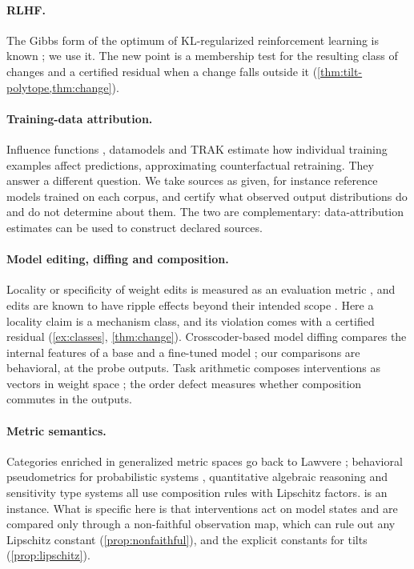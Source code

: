 \documentclass[11pt]{article}
\theoremstyle{definition}
\theoremstyle{remark}
\begin{document}
\paragraph{RLHF.} The Gibbs form of the optimum of KL-regularized reinforcement learning is known
\cite{Korbak2022,Rafailov2023}; we use it. The new point is a membership test for the resulting class of
changes and a certified residual when a change falls outside it (\cref{thm:tilt-polytope,thm:change}).

\paragraph{Training-data attribution.} Influence functions \cite{KohLiang2017}, datamodels
\cite{Ilyas2022} and TRAK \cite{Park2023} estimate how individual training examples affect predictions,
approximating counterfactual retraining. They answer a different question. We take sources as given,
for instance reference models trained on each corpus, and certify what observed output distributions
do and do not determine about them. The two are complementary: data-attribution estimates can be used
to construct declared sources.

\paragraph{Model editing, diffing and composition.} Locality or specificity of weight edits is measured
as an evaluation metric \cite{Meng2022}, and edits are known to have ripple effects beyond their
intended scope \cite{Cohen2024}. Here a locality claim is a mechanism class, and its violation comes
with a certified residual (\cref{ex:classes}, \cref{thm:change}). Crosscoder-based model diffing compares
the internal features of a base and a fine-tuned model \cite{Minder2025}; our comparisons are
behavioral, at the probe outputs. Task arithmetic composes interventions as vectors in weight space
\cite{Ilharco2023}; the order defect measures whether composition commutes in the outputs.

\paragraph{Metric semantics.} Categories enriched in generalized metric spaces go back to Lawvere
\cite{Lawvere1973}; behavioral pseudometrics for probabilistic systems \cite{Desharnais2004},
quantitative algebraic reasoning \cite{MPP2016} and sensitivity type systems \cite{ReedPierce2010} all
use composition rules with Lipschitz factors.  is an instance. What is specific
here is that interventions act on model states and are compared only through a non-faithful
observation map, which can rule out any Lipschitz constant (\cref{prop:nonfaithful}), and the explicit
constants for tilts (\cref{prop:lipschitz}).
\end{document}
